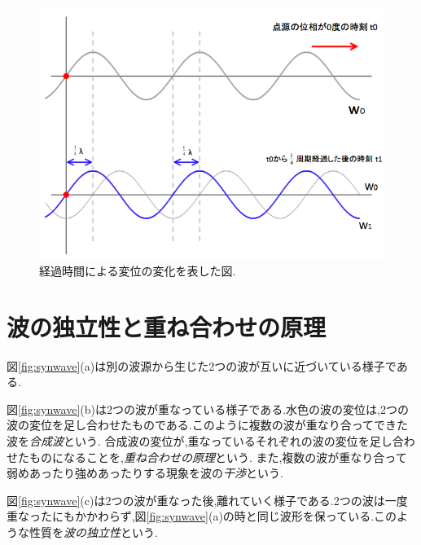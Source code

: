 \begin{figure}[htbp]
 \begin{center}
  \includegraphics[width=150mm]{../background/timeadjust.png}
 \end{center}
 \caption{経過時間による変位の変化を表した図.}
 \label{fig:timeadjust}
\end{figure}






\newpage
\section{波の独立性と重ね合わせの原理}
図\ref{fig:synwave}(a)は別の波源から生じた2つの波が互いに近づいている様子である.

図\ref{fig:synwave}(b)は2つの波が重なっている様子である.水色の波の変位は,2つの波の変位を足し合わせたものである.このように複数の波が重なり合ってできた波を\emph{合成波}という.
合成波の変位が,重なっているそれぞれの波の変位を足し合わせたものになることを,\emph{重ね合わせの原理}という. また,複数の波が重なり合って弱めあったり強めあったりする現象を波の\emph{干渉}という.

図\ref{fig:synwave}(c)は2つの波が重なった後,離れていく様子である.2つの波は一度重なったにもかかわらず,図\ref{fig:synwave}(a)の時と同じ波形を保っている.このような性質を\emph{波の独立性}という.

